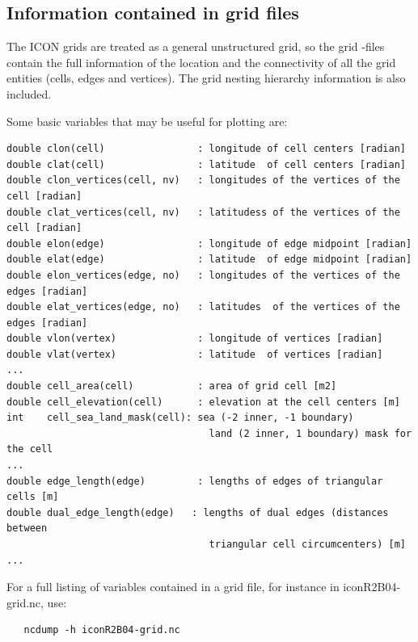 \subsection{Information contained in grid files}

The ICON grids are treated as a general unstructured grid, so the grid \netcdf -files contain the full information of the location and the connectivity of all the grid entities (cells, edges and vertices). The grid nesting hierarchy information is also included.

Some basic variables that may be useful for plotting are:

\begin{small}
  \begin{verbatim}
double clon(cell)                : longitude of cell centers [radian]
double clat(cell)                : latitude  of cell centers [radian]
double clon_vertices(cell, nv)   : longitudes of the vertices of the cell [radian]
double clat_vertices(cell, nv)   : latitudess of the vertices of the cell [radian]
double elon(edge)                : longitude of edge midpoint [radian]
double elat(edge)                : latitude  of edge midpoint [radian]
double elon_vertices(edge, no)   : longitudes of the vertices of the edges [radian]
double elat_vertices(edge, no)   : latitudes  of the vertices of the edges [radian]
double vlon(vertex)              : longitude of vertices [radian]
double vlat(vertex)              : latitude  of vertices [radian]
...
double cell_area(cell)           : area of grid cell [m2]
double cell_elevation(cell)      : elevation at the cell centers [m]
int    cell_sea_land_mask(cell): sea (-2 inner, -1 boundary) 
                                   land (2 inner, 1 boundary) mask for the cell
...
double edge_length(edge)         : lengths of edges of triangular cells [m]
double dual_edge_length(edge)   : lengths of dual edges (distances between
                                   triangular cell circumcenters) [m]
...
  \end{verbatim}
\end{small}

For a full listing of variables contained in a grid file, for instance in iconR2B04-grid.nc, use:

\begin{small}
  \begin{verbatim}
   ncdump -h iconR2B04-grid.nc  
  \end{verbatim}
\end{small}

